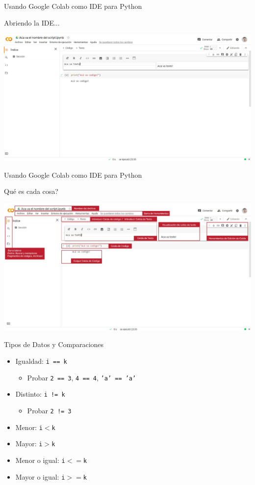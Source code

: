 \documentclass{beamer}
\begin{document}
\begin{frame}{Usando Google Colab como IDE para Python}
\begin{block}{Abriendo la IDE...}
\end{block}
\includegraphics[scale = 0.23]{colab_raw.jpeg}
\end{frame}


\begin{frame}{Usando Google Colab como IDE para Python}
\begin{block}{Qué es cada cosa?}
\end{block}
\includegraphics[scale = 0.23]{colab_edit.jpeg}
\end{frame}


\begin{frame}{Tipos de Datos y Comparaciones}
\begin{itemize}
	\item Igualdad: \texttt{i == k}\pause
	\begin{itemize}
		\item Probar \texttt{2 == 3}, \texttt{4 == 4}, \texttt{'a' == 'a'}
	\end{itemize}\pause
	\item Distinto: \texttt{i != k}\pause
	\begin{itemize}
		\item  Probar \texttt{2 != 3}
	\end{itemize}\pause
	\item Menor: \texttt{i$<$k}\pause
	\item Mayor: \texttt{i$>$k}\pause
	\item Menor o igual: \texttt{i$<=$k}\pause
	\item Mayor o igual: \texttt{i$>=$k}
\end{itemize}
\end{frame}
\end{document}

